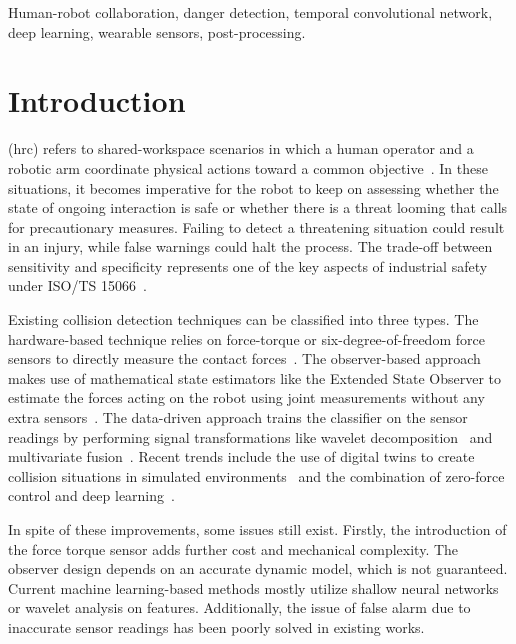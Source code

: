 \documentclass[letterpaper,journal]{IEEEtran}
\begin{document}
\begin{IEEEkeywords}
    Human-robot collaboration, danger detection, temporal convolutional network, deep learning, wearable sensors, post-processing.
\end{IEEEkeywords}

\section{Introduction}\label{sec:introduction}

 (\acs{hrc}) refers to shared-workspace scenarios in which a human operator and a robotic arm coordinate physical actions toward a common objective~\cite{selvaggio2021autonomy}. In these situations, it becomes imperative for the robot to keep on assessing whether the state of ongoing interaction is safe or whether there is a threat looming that calls for precautionary measures. Failing to detect a threatening situation could result in an injury, while false warnings could halt the process. The trade-off between sensitivity and specificity represents one of the key aspects of industrial safety under ISO/TS 15066~\cite{iso15066}.

Existing collision detection techniques can be classified into three types. The hardware-based technique relies on force-torque or six-degree-of-freedom force sensors to directly measure the contact forces~\cite{wang2025sixdof}. The observer-based approach makes use of mathematical state estimators like the Extended State Observer to estimate the forces acting on the robot using joint measurements without any extra sensors~\cite{tonti2024eso}. The data-driven approach trains the classifier on the sensor readings by performing signal transformations like wavelet decomposition~\cite{niu2024wavelet} and multivariate fusion~\cite{fang2024multivariate}. Recent trends include the use of digital twins to create collision situations in simulated environments~\cite{an2024digitaltwin} and the combination of zero-force control and deep learning~\cite{zhao2025zeroforce}.

In spite of these improvements, some issues still exist. Firstly, the introduction of the force torque sensor adds further cost and mechanical complexity. The observer design depends on an accurate dynamic model, which is not guaranteed. Current machine learning-based methods mostly utilize shallow neural networks or wavelet analysis on features. Additionally, the issue of false alarm due to inaccurate sensor readings has been poorly solved in existing works.
\end{document}

